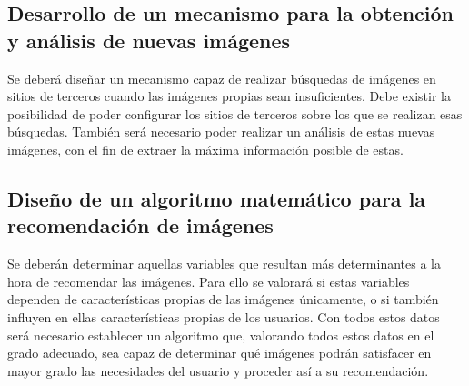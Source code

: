 \subsection{Desarrollo de un mecanismo para la obtención y análisis de nuevas imágenes}
Se deberá diseñar un mecanismo capaz de realizar búsquedas de imágenes en sitios de terceros cuando las imágenes propias sean insuficientes. Debe existir la posibilidad de poder configurar los sitios de terceros sobre los que se realizan esas búsquedas. También será necesario poder realizar un análisis de estas nuevas imágenes, con el fin de extraer la máxima información posible de estas.

\subsection{Diseño de un algoritmo matemático para la recomendación de imágenes}
Se deberán determinar aquellas variables que resultan más determinantes a la hora de recomendar las imágenes. Para ello se valorará si estas variables dependen de características propias de las imágenes únicamente, o si también influyen en ellas características propias de los usuarios. Con todos estos datos será necesario establecer un algoritmo que, valorando todos estos datos en el grado adecuado, sea capaz de determinar qué imágenes podrán satisfacer en mayor grado las necesidades del usuario y proceder así a su recomendación.




